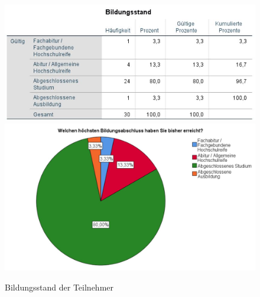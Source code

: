 \documentclass[a4paper,11pt]{article}%
\renewcommand{\\}{\vspace*{0.5\baselineskip} \newline}
\begin{document}
	\begin{figure}[H]
	\centering
		\begin{footnotesize}
			\includegraphics[scale=0.6]{Abbildungen/Pre_QuestionnaireStatistiks/teilnehmerBildungsstand}\\
			\includegraphics[scale=0.5]{Abbildungen/Demographie/teilnehmerBildungsstand}\\
			\caption{Bildungsstand der Teilnehmer}
			\label{fig:teilnehmerBildungsstand}
		\end{footnotesize}
	\end{figure}	
	
\end{document}
